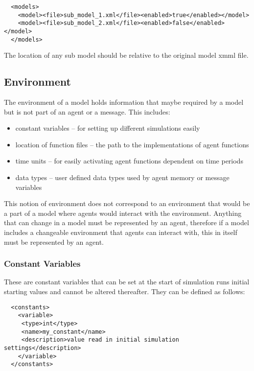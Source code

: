 \begin{verbatim}
  <models>
    <model><file>sub_model_1.xml</file><enabled>true</enabled></model>
    <model><file>sub_model_2.xml</file><enabled>false</enabled></model>
  </models>
\end{verbatim}

The location of any sub model should be relative to the original model xmml
file.

\subsection{Environment}

The environment of a model holds information that maybe required by a model but
is not part of an agent or a message. This includes:

\begin{itemize}
\item constant variables -- for setting up different simulations easily
\item location of function files -- the path to the implementations of agent
functions
\item time units -- for easily activating agent functions dependent on time
periods
\item data types -- user defined data types used by agent memory or
message variables
\end{itemize}

This notion of environment does not correspond to an environment that would be
a part of a model where agents would interact with the environment. Anything
that can change in a model must be represented by an agent, therefore if a
model includes a changeable environment that agents can interact with, this in
itself must be represented by an agent.

\subsubsection{Constant Variables}

These are constant variables that can be set at the start of simulation runs
initial starting values and cannot be altered thereafter. They can be defined as
follows:

\begin{verbatim}
  <constants>
    <variable>
     <type>int</type>
     <name>my_constant</name>
     <description>value read in initial simulation settings</description>
    </variable>
  </constants>
\end{verbatim}

